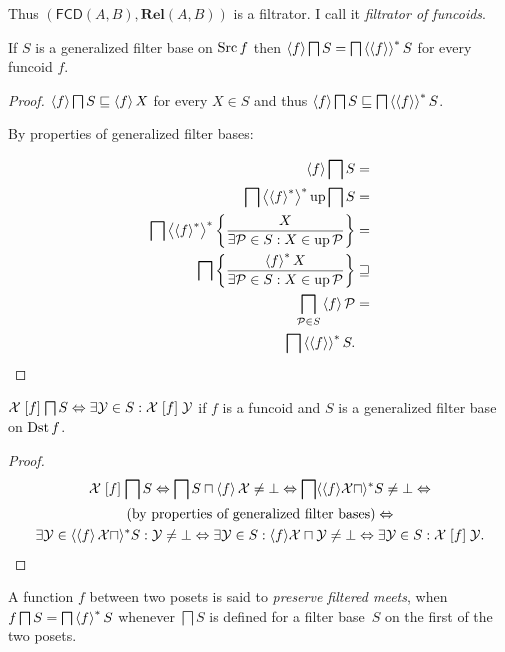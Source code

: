 Thus $(\mathsf{FCD}(A,B),\mathbf{Rel}(A,B))$ is a filtrator. I call
it \emph{filtrator of funcoids}.
\begin{thm}
\label{supfun-genbase}If $S$ is a generalized filter base on $\operatorname{Src} f$
then $\left\langle f\right\rangle\bigsqcap S=\bigsqcap\left\langle \left\langle f\right\rangle\right\rangle ^{\ast}S$ for every
funcoid $f$.\end{thm}
\begin{proof}
$\left\langle f\right\rangle\bigsqcap S\sqsubseteq\left\langle f\right\rangle X$ for every $X\in S$ and
thus $\left\langle f\right\rangle\bigsqcap S\sqsubseteq\bigsqcap\left\langle \left\langle f\right\rangle\right\rangle ^{\ast}S$.

By properties of generalized filter bases:

\begin{align*}
\left\langle f\right\rangle\bigsqcap S & =\\
\bigsqcap\left\langle \left\langle f\right\rangle ^{\ast}\right\rangle ^{\ast}\operatorname{up}\bigsqcap S & =\\
\bigsqcap\left\langle \left\langle f\right\rangle ^{\ast}\right\rangle ^{\ast}\left\{ \frac{X}{\exists\mathcal{P}\in
S:X\in\operatorname{up}\mathcal{P}}\right\} & =\\
\bigsqcap\left\{ \frac{\left\langle f\right\rangle ^{\ast}X}{\exists\mathcal{P}\in S:X\in\operatorname{up}\mathcal{P}}\right\} &
\sqsupseteq\\
\bigsqcap_{\mathcal{P}\in S}\left\langle f\right\rangle\mathcal{P} & =\\
\bigsqcap\left\langle \left\langle f\right\rangle\right\rangle ^{\ast}S.
\end{align*}
\end{proof}
\begin{prop}
$\mathcal{X}\mathrel{\left[f\right]}\bigsqcap S\Leftrightarrow\exists\mathcal{Y}\in
S:\mathcal{X}\mathrel{\left[f\right]}\mathcal{Y}$
if $f$ is a funcoid and $S$ is a generalized filter base on $\operatorname{Dst} f$.\end{prop}
\begin{proof}
~
\begin{multline*}
\mathcal{X}\mathrel{\left[f\right]}\bigsqcap S\Leftrightarrow\bigsqcap S\sqcap\left\langle f\right\rangle\mathcal{X}\neq\bot\Leftrightarrow\bigsqcap\langle\langle
f\rangle\mathcal{X}\sqcap\rangle^{\ast}S\neq\bot\Leftrightarrow\\
\text{(by properties of generalized filter bases)}\Leftrightarrow\\
\exists\mathcal{Y}\in\langle\left\langle f\right\rangle\mathcal{X}\sqcap\rangle^{\ast}S:\mathcal{Y}
\neq\bot\Leftrightarrow\exists\mathcal{Y}\in S:\langle
f\rangle\mathcal{X}\sqcap\mathcal{Y}\neq\bot\Leftrightarrow\exists\mathcal{Y}\in
S:\mathcal{X}\mathrel{\left[f\right]}\mathcal{Y}.
\end{multline*}
\end{proof}
\begin{defn}
A function $f$ between two posets is said to \emph{preserve filtered meets}, when $f\bigsqcap S=\bigsqcap\left\langle f\right\rangle ^{\ast}S$
whenever $\bigsqcap S$ is defined for a filter base~$S$ on the first of the two posets.
\end{defn}
